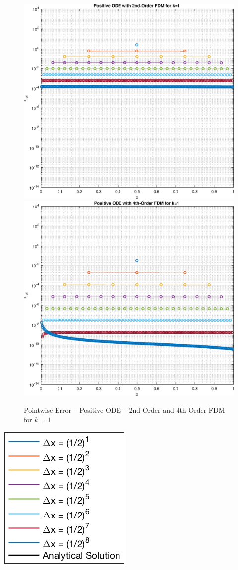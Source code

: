 \documentclass[10pt, reqno]{article}		%
\numberwithin{equation}{section}
\begin{document}
\begin{figure}[H]
	\begin{center}
		\includegraphics[width = 0.49\linewidth]{error_positive_ode_order_2_k_1}
		\includegraphics[width = 0.49\linewidth]{error_positive_ode_order_4_k_1}
		\caption{Pointwise Error -- Positive ODE -- 2nd-Order and 4th-Order FDM for $k = 1$}
	\end{center}
\end{figure}

\begin{center}
\includegraphics[height = 0.13\linewidth]{legend}
\end{center}

\newpage
\end{document}
